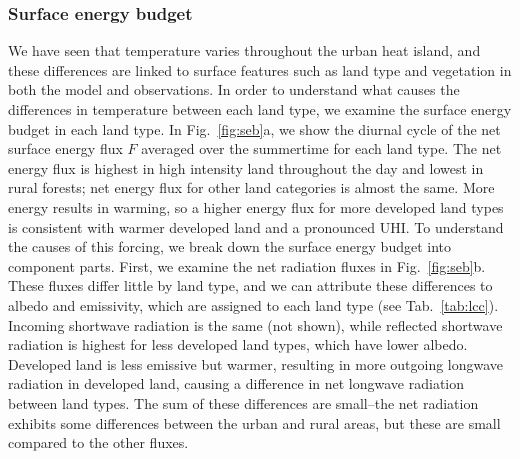 \documentclass[draft,linenumbers]{agujournal}
\begin{document}
\subsubsection{Surface energy budget}
We have seen that temperature varies throughout the urban heat island, and these differences are linked to surface features such as land type and vegetation in both the model and observations. 
In order to understand what causes the differences in temperature between each land type, we examine the surface energy budget in each land type. 
 In Fig.~\ref{fig:seb}a, we show the diurnal cycle of the net surface energy flux $F$ averaged over the summertime for each land type. The net energy flux is highest in high intensity land throughout the day and lowest in rural forests; net energy flux for other land categories is almost the same. More energy results in warming, so a higher energy flux for more developed land types is consistent with warmer developed land and a pronounced UHI. 
 To understand the causes of this forcing, we break down the surface energy budget into component parts. First, we examine the net radiation fluxes in Fig.~\ref{fig:seb}b. These fluxes differ little by land type, and we can attribute these differences to albedo and emissivity, which are assigned to each land type (see Tab.~\ref{tab:lcc}). Incoming shortwave radiation is the same (not shown), while reflected shortwave radiation is highest for less developed land types, which have lower albedo. 
Developed land is less emissive but warmer, resulting in more outgoing longwave radiation in developed land, causing a difference in net longwave radiation between land types. 
The sum of these differences are small--the net radiation exhibits some differences between the urban and rural areas, but these are small compared to the other fluxes. 
\end{document}
